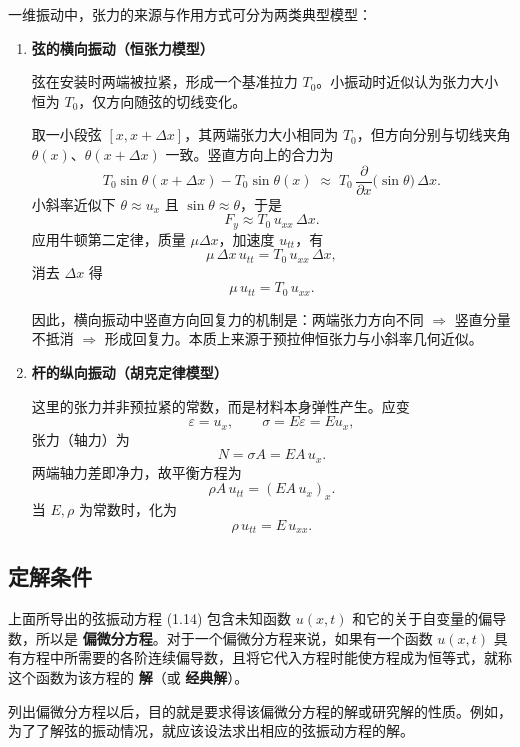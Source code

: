 \begin{proposition}[张力分析]
一维振动中，张力的来源与作用方式可分为两类典型模型：

\begin{enumerate}[label=\Alph*.]
  \item \textbf{弦的横向振动（恒张力模型）}  

  弦在安装时两端被拉紧，形成一个基准拉力 $T_0$。小振动时近似认为张力大小恒为 $T_0$，仅方向随弦的切线变化。

  取一小段弦 $[x,x+\Delta x]$，其两端张力大小相同为 $T_0$，但方向分别与切线夹角 $\theta(x)$、$\theta(x+\Delta x)$ 一致。竖直方向上的合力为
  \[
  T_0\sin\theta(x+\Delta x)-T_0\sin\theta(x)
  \;\approx\;T_0\,\frac{\partial}{\partial x}\!\big(\sin\theta\big)\,\Delta x.
  \]
  小斜率近似下 $\theta\approx u_x$ 且 $\sin\theta\approx \theta$，于是
  \[
  F_y \approx T_0\,u_{xx}\,\Delta x.
  \]
  应用牛顿第二定律，质量 $\mu\Delta x$，加速度 $u_{tt}$，有
  \[
  \mu\,\Delta x\,u_{tt} = T_0\,u_{xx}\,\Delta x,
  \]
  消去 $\Delta x$ 得
  \[
  \mu\,u_{tt}=T_0\,u_{xx}.
  \]

  因此，横向振动中竖直方向回复力的机制是：两端张力方向不同 $\Rightarrow$ 竖直分量不抵消 $\Rightarrow$ 形成回复力。本质上来源于预拉伸恒张力与小斜率几何近似。

  \item \textbf{杆的纵向振动（胡克定律模型）}  

  这里的张力并非预拉紧的常数，而是材料本身弹性产生。应变
  \[
  \varepsilon = u_x, \qquad \sigma = E\varepsilon = E u_x,
  \]
  张力（轴力）为
  \[
  N = \sigma A = EA\,u_x.
  \]
  两端轴力差即净力，故平衡方程为
  \[
  \rho A\,u_{tt} = (EA\,u_x)_x.
  \]
  当 $E,\rho$ 为常数时，化为
  \[
  \rho\,u_{tt}=E\,u_{xx}.
  \]
\end{enumerate}
\end{proposition}
\subsection{ 定解条件}

\begin{definition}[经典解]
上面所导出的弦振动方程 (1.14) 包含未知函数 $u(x,t)$ 和它的关于自变量的偏导数，所以是 \textbf{偏微分方程}。对于一个偏微分方程来说，如果有一个函数 $u(x,t)$ 具有方程中所需要的各阶连续偏导数，且将它代入方程时能使方程成为恒等式，就称这个函数为该方程的 \textbf{解}（或 \textbf{经典解}）。

列出偏微分方程以后，目的就是要求得该偏微分方程的解或研究解的性质。例如，为了了解弦的振动情况，就应该设法求出相应的弦振动方程的解。
\end{definition}

